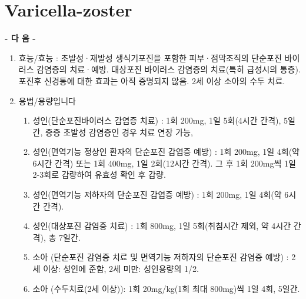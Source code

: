 \section{Varicella-zoster}
{
\par
\begin{center}\textbf{- 다          음 -}\end{center}
\begin{enumerate}[가.]\tightlist
\item 효능/효능 : 초발성·재발성 생식기포진을 포함한 피부·점막조직의 단순포진 바이러스 감염증의 치료·예방.\newline 
대상포진 바이러스 감염증의 치료(특히 급성시의 통증). 포진후 신경통에 대한 효과는 아직 증명되지 않음. \newline
2세 이상 소아의 수두 치료.

\item 용법/용량입니다
	\begin{enumerate}[1)]\tightlist
	\item 성인(단순포진바이러스 감염증 치료) : 1회 200mg, 1일 5회(4시간 간격), 5일간, 중증 초발성 감염증인 경우 치료 연장 가능, 
	\item 성인(면역기능 정상인 환자의 단순포진 감염증 예방) : 1회 200mg, 1일 4회(약 6시간 간격) 또는 1회 400mg, 1일 2회(12시간 간격). 그 후 1회 200mg씩 1일 2-3회로 감량하여 유효성 확인 후 감량. 
	\item 성인(면역기능 저하자의 단순포진 감염증 예방) : 1회 200mg, 1일 4회(약 6시간 간격). 
	\item 성인(대상포진 감염증 치료) : 1회 800mg, 1일 5회(취침시간 제외, 약 4시간 간격), 총 7일간. 
	\item 소아 (단순포진 감염증 치료 및 면역기능 저하자의 단순포진 감염증 예방) : 2세 이상: 성인에 준함, 2세 미만: 성인용량의 1/2. 
	\item 소아 (수두치료(2세 이상)): 1회 20mg/kg(1회 최대 800mg)씩 1일 4회, 5일간. 
	\end{enumerate}
\end{enumerate}
}
